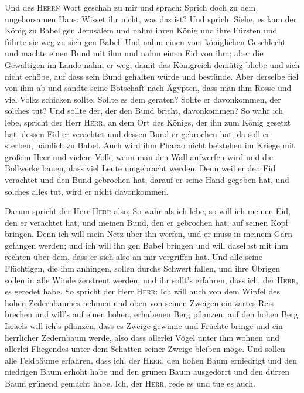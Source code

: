  Und des \textsc{Herrn} Wort geschah zu mir und sprach:
 Sprich doch zu dem ungehorsamen Haus: Wisset ihr nicht,
was das ist? Und sprich: Siehe, es kam der König zu Babel gen Jerusalem
und nahm ihren König und ihre Fürsten und führte sie weg zu sich gen
Babel.  Und nahm einen vom königlichen Geschlecht und
machte einen Bund mit ihm und nahm einen Eid von ihm; aber die
Gewaltigen im Lande nahm er weg,  damit das Königreich
demütig bliebe und sich nicht erhöbe, auf dass sein Bund gehalten würde
und bestünde.  Aber derselbe fiel von ihm ab und sandte
seine Botschaft nach Ägypten, dass man ihm Rosse und viel Volks schicken
sollte. Sollte es dem geraten? Sollte er davonkommen, der solches tut?
Und sollte der, der den Bund bricht, davonkommen?  So
wahr ich lebe, spricht der Herr \textsc{Herr}, an dem Ort des Königs,
der ihn zum König gesetzt hat, dessen Eid er verachtet und dessen Bund
er gebrochen hat, da soll er sterben, nämlich zu Babel. 
Auch wird ihm Pharao nicht beistehen im Kriege mit großem Heer und
vielem Volk, wenn man den Wall aufwerfen wird und die Bollwerke bauen,
dass viel Leute umgebracht werden.  Denn weil er den Eid
verachtet und den Bund gebrochen hat, darauf er seine Hand gegeben hat,
und solches alles tut, wird er nicht davonkommen.

 Darum spricht der Herr \textsc{Herr} also; So wahr als
ich lebe, so will ich meinen Eid, den er verachtet hat, und meinen Bund,
den er gebrochen hat, auf seinen Kopf bringen.  Denn ich
will mein Netz über ihn werfen, und er muss in meinem Garn gefangen
werden; und ich will ihn gen Babel bringen und will daselbst mit ihm
rechten über dem, dass er sich also an mir vergriffen hat.
 Und alle seine Flüchtigen, die ihm anhingen, sollen
durchs Schwert fallen, und ihre Übrigen sollen in alle Winde zerstreut
werden; und ihr sollt's erfahren, dass ich, der \textsc{Herr}, es
geredet habe.  So spricht der Herr \textsc{Herr}: Ich
will auch von dem Wipfel des hohen Zedernbaumes nehmen und oben von
seinen Zweigen ein zartes Reis brechen und will's auf einen hohen,
erhabenen Berg pflanzen;  auf den hohen Berg Israels will
ich's pflanzen, dass es Zweige gewinne und Früchte bringe und ein
herrlicher Zedernbaum werde, also dass allerlei Vögel unter ihm wohnen
und allerlei Fliegendes unter dem Schatten seiner Zweige bleiben möge.
 Und sollen alle Feldbäume erfahren, dass ich, der
\textsc{Herr}, den hohen Baum erniedrigt und den niedrigen Baum erhöht
habe und den grünen Baum ausgedörrt und den dürren Baum grünend gemacht
habe. Ich, der \textsc{Herr}, rede es und tue es auch.

